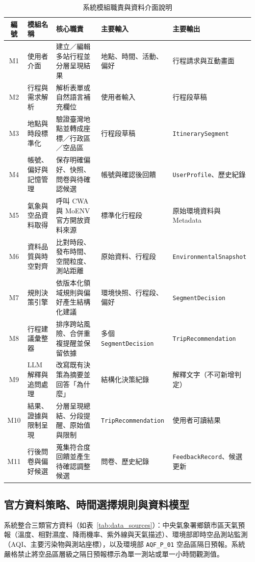\documentclass[conference]{IEEEtran}
\begin{document}
\begin{table}[t]
  \centering
  \caption{系統模組職責與資料介面說明}
  \label{tab:modules}
  \begin{tabularx}{\textwidth}{@{}c l X l l@{}}
    \toprule
    \textbf{編號} & \textbf{模組名稱} & \textbf{核心職責} & \textbf{主要輸入} & \textbf{主要輸出} \\
    \midrule
    M1 & 使用者介面 & 建立／編輯多站行程並分層呈現結果 & 地點、時間、活動、偏好 & 行程請求與互動畫面 \\
    M2 & 行程與需求解析 & 解析表單或自然語言補充欄位 & 使用者輸入 & 行程段草稿 \\
    M3 & 地點與時段標準化 & 驗證臺灣地點並轉成座標／行政區／空品區 & 行程段草稿 & \texttt{ItinerarySegment} \\
    M4 & 帳號、偏好與記憶管理 & 保存明確偏好、快照、問卷與待確認候選 & 帳號與確認後回饋 & \texttt{UserProfile}、歷史紀錄 \\
    M5 & 氣象與空品資料取得 & 呼叫 CWA 與 MoENV 官方開放資料來源 & 標準化行程段 & 原始環境資料與 Metadata \\
    M6 & 資料品質與時空對齊 & 比對時段、發布時間、空間粒度、測站距離 & 原始資料、行程段 & \texttt{EnvironmentalSnapshot} \\
    M7 & 規則決策引擎 & 依版本化領域規則與偏好產生結構化建議 & 環境快照、行程段、偏好 & \texttt{SegmentDecision} \\
    M8 & 行程建議彙整器 & 排序跨站風險、合併重複提醒並保留依據 & 多個 \texttt{SegmentDecision} & \texttt{TripRecommendation} \\
    M9 & LLM 解釋與追問處理 & 改寫既有決策為摘要並回答「為什麼」 & 結構化決策紀錄 & 解釋文字（不可新增判定） \\
    M10 & 結果、證據與限制呈現 & 分層呈現總結、分段提醒、原始值與限制 & \texttt{TripRecommendation} & 使用者可讀結果 \\
    M11 & 行後問卷與偏好候選 & 蒐集符合度回饋並產生待確認調整候選 & 問卷、歷史紀錄 & \texttt{FeedbackRecord}、候選更新 \\
    \bottomrule
  \end{tabularx}
\end{table}

\subsection{官方資料策略、時間選擇規則與資料模型}
系統整合三類官方資料（如表~\ref{tab:data_sources}）：中央氣象署鄉鎮市區天氣預報（溫度、相對濕度、降雨機率、紫外線與天氣描述）、環境部即時空品測站監測（AQI、主要污染物與測站座標），以及環境部 \texttt{AQF\_P\_01} 空品區隔日預報。系統嚴格禁止將空品區層級之隔日預報標示為單一測站或單一小時間觀測值。
\end{document}
